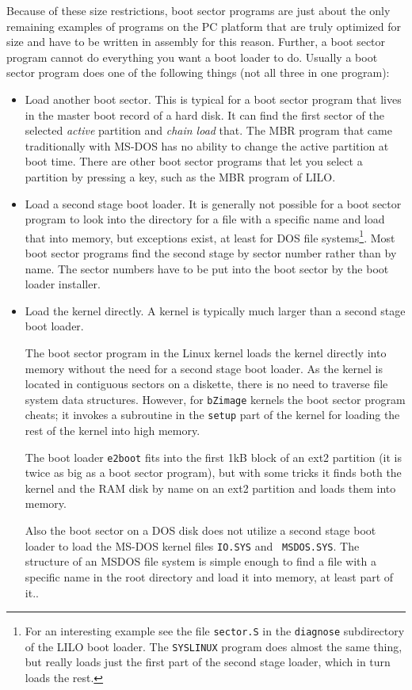 \documentclass[12pt,a4paper]{article}
\begin{document}
Because of these size restrictions, boot sector programs are just
about the only remaining examples of programs on the PC platform that
are truly optimized for size and have to be written in assembly for
this reason. Further, a boot sector program cannot do everything you
want a boot loader to do. Usually a boot sector program does one of
the following things (not all three in one program):
\begin{itemize}
\item Load another boot sector. This is typical for a boot sector
  program that lives in the master boot record of a hard disk. It can
  find the first sector of the selected {\em active} partition and
  {\em chain load} that. The MBR program that came traditionally with
  MS-DOS has no ability to change the active partition at boot
  time. There are other boot sector programs that let you select a
  partition by pressing a key, such as  the MBR program of LILO.
\item Load a second stage boot loader. It is generally not possible
  for a boot sector program to look into the directory for a file with
  a specific name and load that into memory, but exceptions exist, at
  least for DOS file systems\footnote{For an interesting example see
  the file {\tt sector.S} in the {\tt diagnose} subdirectory of the
  LILO boot loader. The {\tt SYSLINUX} program does almost the same
  thing, but really loads just the first part of the second stage
  loader, which in turn loads the rest.}. Most boot sector programs
  find the second stage by sector number rather than by name. The
  sector numbers have to be put into the boot sector by the boot
  loader installer.
\item Load the kernel directly. A kernel is typically much larger than
  a second stage boot loader.

  The boot sector program in the Linux kernel loads the kernel
  directly into memory without the need for a second stage boot
  loader. As the kernel is located in contiguous sectors on a
  diskette, there is no need to traverse file system data
  structures. However, for {\tt bZimage} kernels the boot sector
  program cheats; it invokes a subroutine in the {\tt setup} part of
  the kernel for loading the rest of the kernel into high memory.

  The boot loader {\tt e2boot} fits into the first 1kB block of an
  ext2 partition (it is twice as big as a boot sector program), but
  with some tricks it finds both the kernel and the RAM disk by name
  on an ext2 partition and loads them into memory.

  Also the boot sector on a DOS disk does not utilize a second stage 
  boot loader to load the MS-DOS kernel files {\tt IO.SYS} and {\tt
  MSDOS.SYS}. The structure of an MSDOS file system is simple enough to
  find a file with a specific name in the root directory and load it
  into memory, at least part of it..
\end{itemize}
\end{document}
